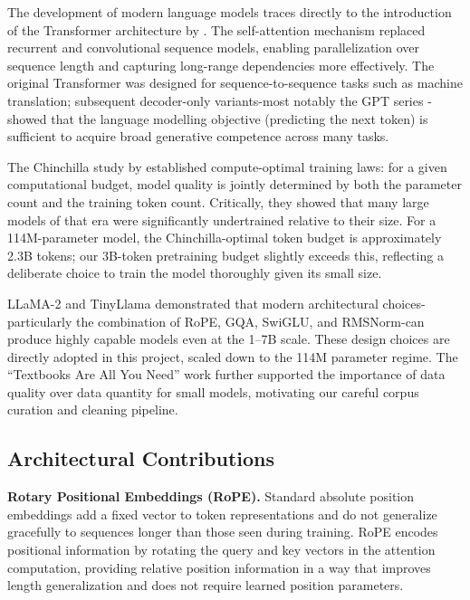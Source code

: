 \documentclass[12pt]{article}
\begin{document}
The development of modern language models traces directly to the introduction of the Transformer architecture by \citet{vaswani2017attention}. The self-attention mechanism replaced recurrent and convolutional sequence models, enabling parallelization over sequence length and capturing long-range dependencies more effectively. The original Transformer was designed for sequence-to-sequence tasks such as machine translation; subsequent decoder-only variants-most notably the GPT series \citep{radford2019language}-showed that the language modelling objective (predicting the next token) is sufficient to acquire broad generative competence across many tasks.

The Chinchilla study by \citet{hoffmann2022training} established compute-optimal training laws: for a given computational budget, model quality is jointly determined by both the parameter count and the training token count. Critically, they showed that many large models of that era were significantly undertrained relative to their size. For a 114M-parameter model, the Chinchilla-optimal token budget is approximately 2.3B tokens; our 3B-token pretraining budget slightly exceeds this, reflecting a deliberate choice to train the model thoroughly given its small size.

LLaMA-2 \citep{touvron2023llama} and TinyLlama \citep{zhang2024tinyllama} demonstrated that modern architectural choices-particularly the combination of RoPE, GQA, SwiGLU, and RMSNorm-can produce highly capable models even at the 1--7B scale. These design choices are directly adopted in this project, scaled down to the 114M parameter regime. The ``Textbooks Are All You Need'' work \citep{li2023textbooks} further supported the importance of data quality over data quantity for small models, motivating our careful corpus curation and cleaning pipeline.

\subsection{Architectural Contributions}

\textbf{Rotary Positional Embeddings (RoPE).} Standard absolute position embeddings add a fixed vector to token representations and do not generalize gracefully to sequences longer than those seen during training. RoPE \citep{su2024roformer} encodes positional information by rotating the query and key vectors in the attention computation, providing relative position information in a way that improves length generalization and does not require learned position parameters.
\end{document}
